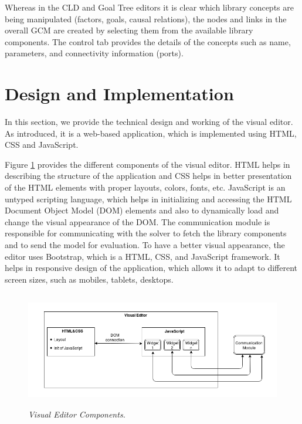 \documentclass[a4paper]{article}
\begin{document}
Whereas in the CLD and Goal Tree editors it is clear which library concepts are being manipulated (factors, goals, causal relations), the nodes and links in the overall GCM are created by selecting them from the available library components. The control tab provides the details of the concepts such as name, parameters, and connectivity information (ports).

\section{Design and Implementation}

In this section, we provide the technical design and working of the visual editor. As introduced, it is a web-based application, which is implemented using HTML, CSS and JavaScript.  

Figure \ref{fig:visual} provides the different components of the visual editor. HTML helps in describing the structure of the application and CSS helps in better presentation of the HTML elements with proper layouts, colors, fonts, etc. JavaScript is an untyped scripting language, which helps in initializing and accessing the HTML Document Object Model (DOM) elements and also to dynamically load and change the visual appearance of the DOM. The communication module is responsible for communicating with the solver to fetch the library components and to send the model for evaluation. To have a better visual appearance, the editor uses Bootstrap, which is a HTML, CSS, and JavaScript framework. It helps in responsive design of the application, which allows it to adapt to different screen sizes, such as mobiles, tablets, desktops.

\begin{figure}
\begin{center}
\includegraphics[height=2in,width=5in]{img/visual.png}
\caption{\small \sl Visual Editor Components.\label{fig:visual}}
\end{center}
\end{figure}
\end{document}
